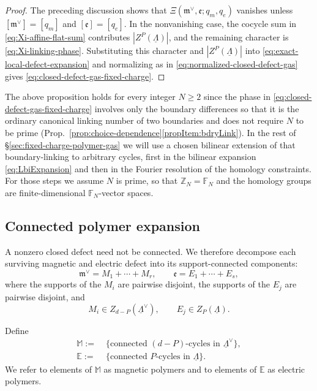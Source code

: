 \documentclass[dvipsnames,a4paper]{article}
\numberwithin{equation}{section}
\theoremstyle{definition}
\theoremstyle{remark}
\begin{document}
\begin{proof}
	The preceding discussion shows that
	\(\Xi(\mathfrak m^\vee,\mathfrak e;q_m,q_e)\) vanishes unless $[\mathfrak m^\vee]=[q_m]$ and $[\mathfrak e]=[q_e]$.
	In the nonvanishing case, the cocycle sum in
	\eqref{eq:Xi-affine-flat-sum} contributes
	\(|Z^P(\underline\Lambda)|\), and the remaining character is \eqref{eq:Xi-linking-phase}. Substituting this character and $|Z^P(\underline\Lambda)|$ into \eqref{eq:exact-local-defect-expansion} and normalizing as in
	\eqref{eq:normalized-closed-defect-gas} gives \eqref{eq:closed-defect-gas-fixed-charge}.
\end{proof}
The above proposition holds for every integer \(N\ge 2\) since the phase in
\eqref{eq:closed-defect-gas-fixed-charge} involves only the boundary
differences so that it is the ordinary canonical linking number of two boundaries and does not require \(N\) to be prime (Prop.~\ref{prop:choice-dependence}\ref{propItem:bdryLink}). In the rest of \S\ref{sec:fixed-charge-polymer-gas} we will use a chosen bilinear extension of
that boundary-linking to arbitrary cycles, first in the bilinear expansion
\eqref{eq:LbiExpansion} and then in the Fourier resolution of the homology
constraints. For those steps we assume \(N\) is prime, so that
\(\mathbb Z_N=\mathbb F_N\) and the homology groups are finite-dimensional
\(\mathbb F_N\)-vector spaces.





\subsection{Connected polymer expansion}
\label{sec:fixed-charge-connected-polymers}

A nonzero closed defect need not be connected. We therefore decompose each surviving
magnetic and electric defect into its support-connected components:
\begin{equation}
	\mathfrak m^\vee=M_1+\cdots+M_r,
	\qquad
	\mathfrak e=E_1+\cdots+E_s,
	\label{eq:connected-defect-decomposition}
\end{equation}
where the supports of the \(M_i\) are pairwise disjoint, the supports of the \(E_j\) are
pairwise disjoint, and
\begin{equation}
	M_i\in Z_{d-P}(\underline\Lambda^\vee),
	\qquad
	E_j\in Z_P(\underline\Lambda).
\end{equation}

Define
\begin{equation}
\begin{aligned}
	\mathbb M 
	:=&\;
	\{\text{connected }(d-P)\text{-cycles in }\underline\Lambda^\vee\},
	\\
	\mathbb E 
	:=&\;
	\{\text{connected }P\text{-cycles in }\underline\Lambda\}.
\end{aligned}
	\label{eq:polymer-sets-fixed-charge}
\end{equation}
We refer to elements of \(\mathbb M \) as magnetic polymers and to elements of
\(\mathbb E \) as electric polymers.
\end{document}
